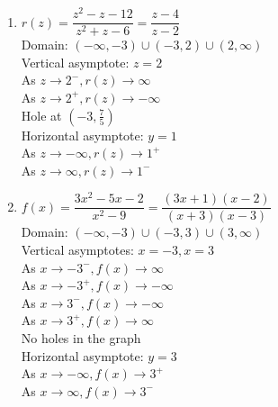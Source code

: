 \begin{multicols}{2}
\begin{enumerate}
\setcounter{enumi}{\value{HW}}

\item $r(z) = \dfrac{z^2-z-12}{z^{2} +z - 6} = \dfrac{z-4}{z - 2}$\\
Domain: $(-\infty, -3) \cup (-3, 2) \cup (2, \infty)$\\
Vertical asymptote: $z = 2$\\
As $z \rightarrow 2^{-}, r(z) \rightarrow \infty$\\
As $z \rightarrow 2^{+}, r(z) \rightarrow -\infty$\\
Hole at $\left(-3, \frac{7}{5} \right)$ \\
Horizontal asymptote: $y = 1$ \\
As $z \rightarrow -\infty, r(z) \rightarrow 1^{+}$\\
As $z \rightarrow \infty, r(z) \rightarrow 1^{-}$\\


\vfill

\columnbreak

\item $f(x) = \dfrac{3x^2-5x-2}{x^{2} -9} = \dfrac{(3x+1)(x-2)}{(x + 3)(x - 3)}$\\
Domain: $(-\infty, -3) \cup (-3, 3) \cup (3, \infty)$\\
Vertical asymptotes: $x = -3, x = 3$\\
As $x \rightarrow -3^{-}, f(x) \rightarrow \infty$\\
As $x \rightarrow -3^{+}, f(x) \rightarrow -\infty$\\
As $x \rightarrow 3^{-}, f(x) \rightarrow -\infty$\\
As $x \rightarrow 3^{+}, f(x) \rightarrow \infty$\\
No holes in the graph\\
Horizontal asymptote: $y = 3$ \\
As $x \rightarrow -\infty, f(x) \rightarrow 3^{+}$\\
As $x \rightarrow \infty, f(x) \rightarrow 3^{-}$\\

\setcounter{HW}{\value{enumi}}
\end{enumerate}
\end{multicols}

